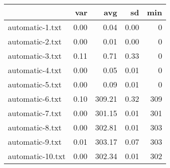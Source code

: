 \begin{tabular}{lrrrr}
  \toprule  & var & avg & sd & min \\ 
  \midrule automatic-1.txt & 0.00 & 0.04 & 0.00 & 0 \\ 
  automatic-2.txt & 0.00 & 0.01 & 0.00 & 0 \\ 
  automatic-3.txt & 0.11 & 0.71 & 0.33 & 0 \\ 
  automatic-4.txt & 0.00 & 0.05 & 0.01 & 0 \\ 
  automatic-5.txt & 0.00 & 0.09 & 0.01 & 0 \\ 
  automatic-6.txt & 0.10 & 309.21 & 0.32 & 309 \\ 
  automatic-7.txt & 0.00 & 301.15 & 0.01 & 301 \\ 
  automatic-8.txt & 0.00 & 302.81 & 0.01 & 303 \\ 
  automatic-9.txt & 0.01 & 303.17 & 0.07 & 303 \\ 
  automatic-10.txt & 0.00 & 302.34 & 0.01 & 302 \\ 
   \bottomrule \end{tabular}
